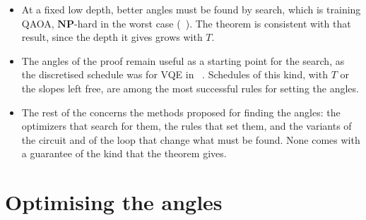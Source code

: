 \documentclass[handoutsbeamer.tex]{subfiles}
\begin{document}
\begin{frame}
\onp{\footnotesize}
\begin{itemize}\setlength\itemsep{0.3em}
    \item At a fixed low depth, better angles must be found by search, which is training QAOA, $\mathbf{NP}$-hard in the worst case (\Chap~). The theorem is consistent with that result, since the depth it gives grows with $T$.
    \item The angles of the proof remain useful as a starting point for the search, as the discretised schedule was for VQE in \Chap~. Schedules of this kind, with $T$ or the slopes left free, are among the most successful rules for setting the angles.
    \item The rest of the \chap{} concerns the methods proposed for finding the angles: the optimizers that search for them, the rules that set them, and the variants of the circuit and of the loop that change what must be found. None comes with a guarantee of the kind that the theorem gives.
\end{itemize}
\end{frame}

\section{Optimising the angles}\label{sec:ch06:optim}
\end{document}
